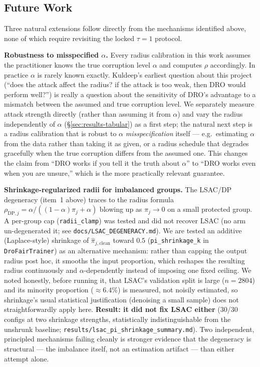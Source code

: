\subsection{Future Work}
\label{sec:future-work}
Three natural extensions follow directly from the mechanisms identified
above, none of which require revisiting the locked $\tau{=}1$ protocol.

\textbf{Robustness to misspecified $\alpha$.} Every radius calibration in
this work assumes the practitioner knows the true corruption level
$\alpha$ and computes $\rho$ accordingly. In practice $\alpha$ is rarely
known exactly. Kuldeep's earliest question about this project (``does
the attack affect the radius? if the attack is too weak, then DRO would
perform well?'') is really a question about the sensitivity of DRO's
advantage to a mismatch between the assumed and true corruption level.
We separately measure attack strength directly (rather than assuming it
from $\alpha$) and vary the radius independently of $\alpha$
(\S\ref{sec:results-tabular}) as a first step; the natural next step is
a radius calibration that is robust to $\alpha$ \emph{misspecification}
itself --- e.g.\ estimating $\alpha$ from the data rather than taking it
as given, or a radius schedule that degrades gracefully when the true
corruption differs from the assumed one. This changes the claim from
``DRO works if you tell it the truth about $\alpha$'' to ``DRO works
even when you are unsure,'' which is the more practically relevant
guarantee.

\textbf{Shrinkage-regularized radii for imbalanced groups.} The
LSAC/DP degeneracy (item~1 above) traces to the radius formula
$\rho_{\mathrm{DP},j}=\alpha/((1-\alpha)\pi_j+\alpha)$ blowing up as
$\pi_j\to0$ on a small protected group. A per-group cap
(\texttt{radii\_clamp}) was tested and did not recover LSAC (no arm
un-degenerated it; see \texttt{docs/LSAC\_DEGENERACY.md}). We are
tested an additive (Laplace-style) shrinkage of
$\hat\pi_{j,\mathrm{clean}}$ toward $0.5$
(\texttt{pi\_shrinkage\_k} in \texttt{DroFairTrainer}) as an alternative
mechanism: rather than capping the output radius post hoc, it smooths
the input proportion, which reshapes the resulting radius continuously
and $\alpha$-dependently instead of imposing one fixed ceiling. We noted
honestly, before running it, that LSAC's validation split is large
($n{=}2804$) and its minority proportion ($\approx6.4\%$) is measured,
not noisily estimated, so shrinkage's usual statistical justification
(denoising a small sample) does not straightforwardly apply here.
\textbf{Result: it did not fix LSAC either} (30/30 configs at two
shrinkage strengths, statistically indistinguishable from the unshrunk
baseline; \texttt{results/lsac\_pi\_shrinkage\_summary.md}). Two
independent, principled mechanisms failing cleanly is stronger evidence
that the degeneracy is structural --- the imbalance itself, not an
estimation artifact --- than either attempt alone.

